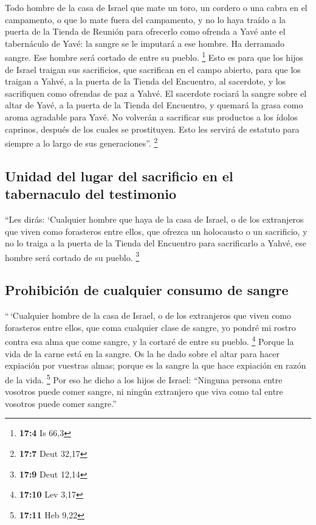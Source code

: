  Todo hombre de la casa de Israel que mate un toro, un
cordero o una cabra en el campamento, o que lo mate fuera del
campamento,  y no lo haya traído a la puerta de la Tienda
de Reunión para ofrecerlo como ofrenda a Yavé ante el tabernáculo de
Yavé: la sangre se le imputará a ese hombre. Ha derramado sangre. Ese
hombre será cortado de entre su pueblo. \footnote{\textbf{17:4} Is 66,3}
 Esto es para que los hijos de Israel traigan sus
sacrificios, que sacrifican en el campo abierto, para que los traigan a
Yahvé, a la puerta de la Tienda del Encuentro, al sacerdote, y los
sacrifiquen como ofrendas de paz a Yahvé.  El sacerdote
rociará la sangre sobre el altar de Yavé, a la puerta de la Tienda del
Encuentro, y quemará la grasa como aroma agradable para Yavé.
 No volverán a sacrificar sus productos a los ídolos
caprinos, después de los cuales se prostituyen. Esto les servirá de
estatuto para siempre a lo largo de sus generaciones''. \footnote{\textbf{17:7}
  Deut 32,17}

\hypertarget{unidad-del-lugar-del-sacrificio-en-el-tabernaculo-del-testimonio}{%
\subsection{Unidad del lugar del sacrificio en el tabernaculo del
testimonio}\label{unidad-del-lugar-del-sacrificio-en-el-tabernaculo-del-testimonio}}

 ``Les dirás: `Cualquier hombre que haya de la casa de
Israel, o de los extranjeros que viven como forasteros entre ellos, que
ofrezca un holocausto o un sacrificio,  y no lo traiga a
la puerta de la Tienda del Encuentro para sacrificarlo a Yahvé, ese
hombre será cortado de su pueblo. \footnote{\textbf{17:9} Deut 12,14}

\hypertarget{prohibiciuxf3n-de-cualquier-consumo-de-sangre}{%
\subsection{Prohibición de cualquier consumo de
sangre}\label{prohibiciuxf3n-de-cualquier-consumo-de-sangre}}

 ``\,`Cualquier hombre de la casa de Israel, o de los
extranjeros que viven como forasteros entre ellos, que coma cualquier
clase de sangre, yo pondré mi rostro contra esa alma que come sangre, y
la cortaré de entre su pueblo. \footnote{\textbf{17:10} Lev 3,17}
 Porque la vida de la carne está en la sangre. Os la he
dado sobre el altar para hacer expiación por vuestras almas; porque es
la sangre la que hace expiación en razón de la vida. \footnote{\textbf{17:11}
  Heb 9,22}  Por eso he dicho a los hijos de Israel:
``Ninguna persona entre vosotros puede comer sangre, ni ningún
extranjero que viva como tal entre vosotros puede comer sangre.''

